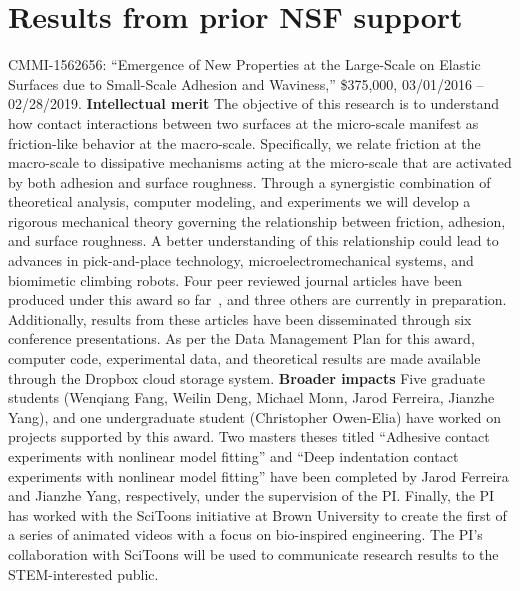 \documentclass[10pt,letterpaper]{article}
\begin{document}
\section{Results from prior NSF support}
  \label{s:priorfund}
  CMMI-1562656: ``Emergence of New Properties at the Large-Scale on Elastic Surfaces due to  Small-Scale Adhesion and Waviness,'' \$375,000, 03/01/2016 -- 02/28/2019. \textbf{Intellectual merit} The objective of this research is to understand how contact interactions between two surfaces at the micro-scale manifest as friction-like behavior at the macro-scale. Specifically, we relate friction at the macro-scale to dissipative mechanisms acting at the micro-scale that are activated by both adhesion and surface roughness. Through a synergistic combination of theoretical analysis, computer modeling, and experiments we will develop a rigorous mechanical theory governing the relationship between friction, adhesion, and surface roughness. A better understanding of this relationship could lead to advances in pick-and-place technology, microelectromechanical systems, and biomimetic climbing robots. Four peer reviewed journal articles have been produced under this award so far~\cite{monn2017new,monn2017enhanced,monn2017JoVE,deng2017molecular}, and three others are currently in preparation. Additionally, results from these articles have been disseminated through six conference presentations. As per the Data Management Plan for this award, computer code, experimental data, and theoretical results are made available through the Dropbox cloud storage system. \textbf{Broader impacts} Five graduate students (Wenqiang Fang, Weilin Deng, Michael Monn, Jarod Ferreira, Jianzhe Yang), and one undergraduate student (Christopher Owen-Elia) have worked on projects supported by this award. Two masters theses titled ``Adhesive contact experiments with nonlinear model fitting''  and ``Deep indentation contact experiments with nonlinear model fitting'' have been completed by Jarod Ferreira and Jianzhe Yang, respectively, under the supervision of the PI. Finally, the PI has worked with the SciToons initiative at Brown University to create the first of a series of animated videos with a focus on bio-inspired engineering. The PI's collaboration with SciToons will be used to communicate research results to the STEM-interested public.

\end{document}
